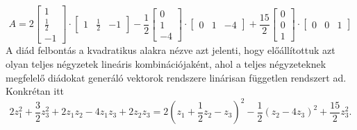 \documentclass[a4paper, showtrims]{memoir}
\theoremstyle{plain}
\theoremstyle{remark}
\theoremstyle{definition}
\begin{document}
\[
    A
    =
    2
    \begin{bmatrix}
    1\\ \frac{1}{2}\\ -1
    \end{bmatrix}
    \cdot
    \begin{bmatrix}
    1& \frac{1}{2}& -1
    \end{bmatrix}
    -\frac{1}{2}
    \begin{bmatrix}
        0\\1\\-4
    \end{bmatrix}
    \cdot
    \begin{bmatrix}
        0&1&-4
    \end{bmatrix}
    +
    \frac{15}{2}
    \begin{bmatrix}
        0\\0\\1
    \end{bmatrix}
    \cdot
    \begin{bmatrix}
        0&0&1
    \end{bmatrix}
\]
A diád felbontás a kvadratikus alakra nézve azt jelenti, 
hogy előállítottuk azt olyan teljes négyzetek lineáris kombinációjaként,
ahol a teljes négyzeteknek megfelelő diádokat generáló vektorok rendszere linárisan független rendszert ad.
Konkrétan itt
\[
    2z_1^2+\frac{3}{2}z_3^2+2z_1z_2-4z_1z_3+2z_2z_3
    =
    2\left( z_1+\frac{1}{2}z_2-z_3 \right)^2
    -\frac{1}{2}\left( z_2-4z_3 \right)^2
    +\frac{15}{2}z_3^2.
\]
\end{document}
